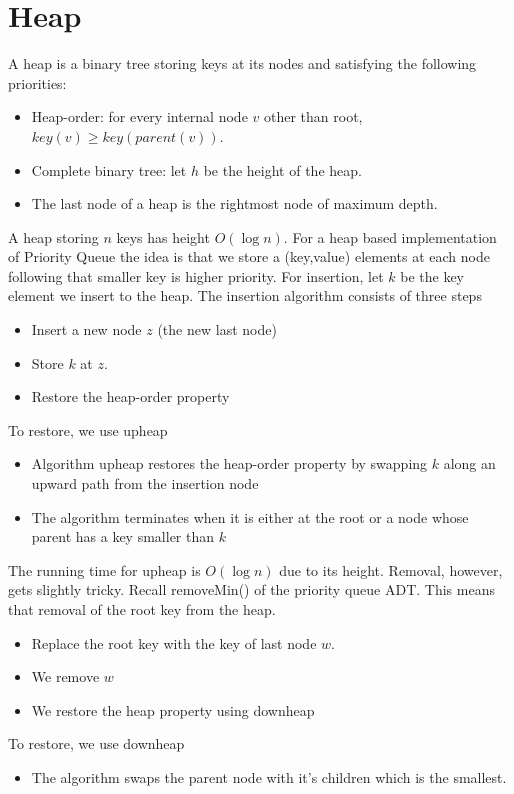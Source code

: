 \documentclass[a4paper]{article}
\theoremstyle{plain}
\theoremstyle{definition}
\theoremstyle{remark}
\begin{document}
\section{Heap}
A heap is a binary tree storing keys at its nodes and satisfying the following priorities:
\begin{itemize}
	\item Heap-order: for every internal node $v$ other than root, $key(v)\ge key(parent(v))$. 
	\item Complete binary tree: let $h$ be the height of the heap.
	\item The last node of a heap is the rightmost node of maximum depth.
\end{itemize}
A heap storing $n$ keys has height $O(\log n)$. For a heap based implementation of Priority Queue the idea is that we store a (key,value) elements at each node following that smaller key is higher priority. For insertion, let $k$ be the key element we insert to the heap. The insertion algorithm consists of three steps
\begin{itemize}
	\item Insert a new node $z$ (the new last node)
	\item Store $k$ at $z$.
	\item Restore the heap-order property
\end{itemize}
To restore, we use upheap
\begin{itemize}
	\item Algorithm upheap restores the heap-order property by swapping $k$ along an upward path from the insertion node
	\item The algorithm terminates when it is either at the root or a node whose parent has a key smaller than $k$
\end{itemize}
The running time for upheap is $O(\log n)$ due to its height. Removal, however, gets slightly tricky.
Recall removeMin() of the priority queue ADT. This means that removal of the root key from the heap.
\begin{itemize}
	\item Replace the root key with the key of last node $w$.
	\item We remove  $w$
	\item We restore the heap property using downheap
\end{itemize}
To restore, we use downheap
\begin{itemize}
	\item The algorithm swaps the parent node with it's children which is the smallest. 
\end{itemize}
\end{document}
